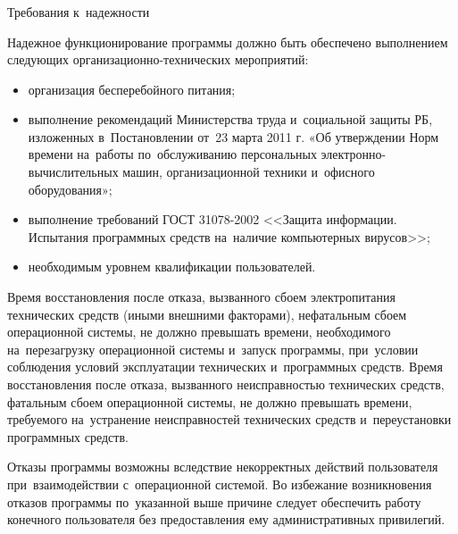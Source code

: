 \subsubsection{} Требования к~надежности
\label{sec:analysis:research:req:reliability}

Надежное функционирование программы должно быть обеспечено выполнением следующих организационно-технических мероприятий:

\begin{itemize}
	\item организация бесперебойного питания;
	\item выполнение рекомендаций Министерства труда и~социальной защиты РБ, изложенных в~Постановлении от~23 марта 2011 г. «Об утверждении Норм времени на~работы по~обслуживанию персональных электронно-вычислитель\-ных машин, организационной техники и~офисного оборудования»;
	\item выполнение требований ГОСТ 31078-2002 <<Защита информации. Испытания программных средств на~наличие компьютерных вирусов>>;
	\item необходимым уровнем квалификации пользователей.
\end{itemize}

Время восстановления после отказа, вызванного сбоем электропитания технических средств (иными внешними факторами), нефатальным сбоем операционной системы, не должно превышать времени, необходимого на~перезагрузку операционной системы и~запуск программы, при~условии соблюдения условий эксплуатации технических и~программных средств. Время восстановления после отказа, вызванного неисправностью технических средств, фатальным сбоем операционной системы, не должно превышать времени, требуемого на~устранение неисправностей технических средств и~переустановки программных средств.

Отказы программы возможны вследствие некорректных действий пользователя при~взаимодействии с~операционной системой. Во избежание возникновения отказов программы по~указанной выше причине следует обеспечить работу конечного пользователя без предоставления ему административных привилегий.